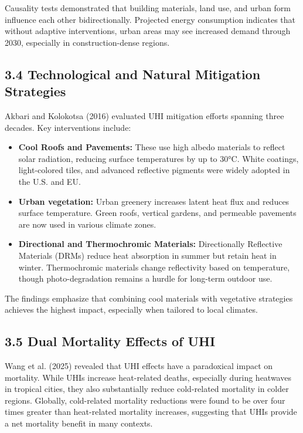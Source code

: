 \documentclass[draft]{agujournal}
\begin{document}
Causality tests demonstrated that building materials, land use, and urban form influence each other bidirectionally. Projected energy consumption indicates that without adaptive interventions, urban areas may see increased demand through 2030, especially in construction-dense regions.

\subsection*{3.4 Technological and Natural Mitigation Strategies}

Akbari and Kolokotsa (2016) evaluated UHI mitigation efforts spanning three decades. Key interventions include:
\begin{itemize}
  \item \textbf{Cool Roofs and Pavements:} These use high albedo materials to reflect solar radiation, reducing surface temperatures by up to 30°C. White coatings, light-colored tiles, and advanced reflective pigments were widely adopted in the U.S. and EU.
  \item \textbf{Urban vegetation:} Urban greenery increases latent heat flux and reduces surface temperature. Green roofs, vertical gardens, and permeable pavements are now used in various climate zones.
  \item \textbf{Directional and Thermochromic Materials:} Directionally Reflective Materials (DRMs) reduce heat absorption in summer but retain heat in winter. Thermochromic materials change reflectivity based on temperature, though photo-degradation remains a hurdle for long-term outdoor use.
\end{itemize}
The findings emphasize that combining cool materials with vegetative strategies achieves the highest impact, especially when tailored to local climates.

\subsection*{3.5 Dual Mortality Effects of UHI}

Wang et al. (2025) revealed that UHI effects have a paradoxical impact on mortality. While UHIs increase heat-related deaths, especially during heatwaves in tropical cities, they also substantially reduce cold-related mortality in colder regions. Globally, cold-related mortality reductions were found to be over four times greater than heat-related mortality increases, suggesting that UHIs provide a net mortality benefit in many contexts.
\end{document}
